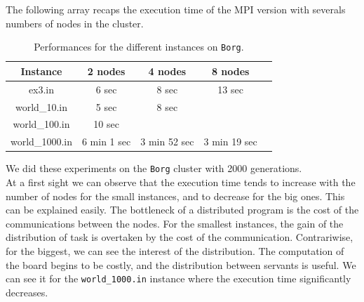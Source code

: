 \documentclass[a4paper,10pt]{article}
\begin{document}
The following array recaps the execution time of the MPI version with severals numbers of nodes in the cluster.
\begin{table}[!ht]
\centering
\begin{tabular}{|c||c|c|c|c|}
  \hline
    Instance     &  2 nodes   & 4 nodes  & 8 nodes  \\
  \hline
    ex3.in       &    6 sec       & 8 sec       &  13 sec \\ 
  \hline
    world\_10.in &    5 sec      & 8 sec      &  \\ 
  \hline
   world\_100.in &    10 sec     &      &  \\ 
  \hline
  world\_1000.in &     6 min 1 sec   & 3 min 52 sec      & 3 min 19 sec  \\ 
  \hline
\end{tabular}
\caption{Performances for the different instances on \texttt{Borg}.}
\end{table}



We did these experiments on the \texttt{Borg} cluster with 2000 generations.
\\

At a first sight we can observe that the execution time tends to increase with the number of nodes for the small instances, and
to decrease for the big ones. This can be explained easily. The bottleneck of a distributed program is the cost of the communications
between the nodes. For the smallest instances, the gain of the distribution of task is overtaken by the cost of the communication.
Contrariwise, for the biggest, we can see the interest of the distribution. The computation of the board begins to be costly, and
the distribution between servants is useful. We can see it for the \texttt{world\_1000.in} instance where the execution time
significantly decreases.
	
\end{document}
